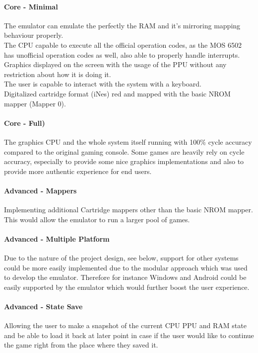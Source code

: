 \documentclass[]{report}
\begin{document}
\paragraph{Core - Minimal}
The emulator can emulate the perfectly the RAM and it's mirroring mapping behaviour properly. 
\\
The CPU capable to execute all the official operation codes, as the MOS 6502 has unofficial operation codes as well, also able to properly handle interrupts. 
\\ 
Graphics displayed on the screen with the usage of the PPU without any restriction about how it is doing it.
\\ 
The user is capable to interact with the system with a keyboard.
\\ 
Digitalized cartridge format (iNes) red and mapped with the basic NROM mapper (Mapper 0).
\paragraph{Core - Full)}
The graphics CPU and the whole system itself running with 100\% cycle accuracy compared to the original gaming console.
Some games are heavily rely on cycle accuracy, especially to provide some nice graphics implementations and also to provide more authentic experience for end users.

\paragraph{Advanced - Mappers}
Implementing additional Cartridge mappers other than the basic NROM mapper\cite{MPPR}. This would allow the emulator to run a larger pool of games.

\paragraph{Advanced - Multiple Platform}
Due to the nature of the project design, see below, support for other systems could be more easily implemented due to the modular approach which was used to develop the emulator. Therefore for instance Windows and Android could be easily supported by the emulator which would further boost the user experience.

\paragraph{Advanced - State Save}
Allowing the user to make a snapshot of the current CPU PPU and RAM state and be able to load it back at later point in case if the user would like to continue the game right from the place where they saved it.
\end{document}
